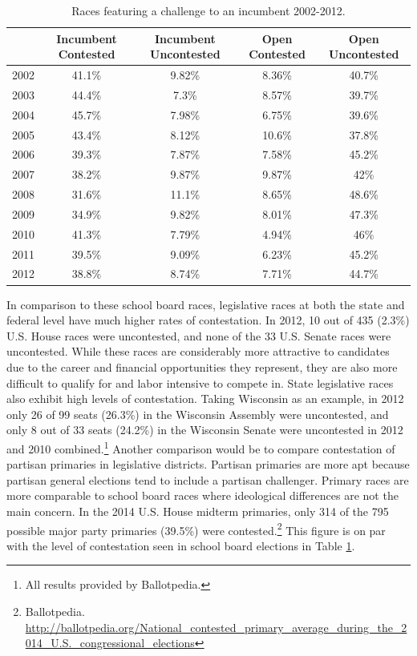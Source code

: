 \begin{table}[ht]
\centering
{\small
\begin{tabular}{lcccc}
  \hline
 & Incumbent Contested & Incumbent Uncontested & Open Contested & Open Uncontested \\ 
  \hline
2002 & 41.1\% & 9.82\% & 8.36\% & 40.7\% \\ 
  2003 & 44.4\% & 7.3\% & 8.57\% & 39.7\% \\ 
  2004 & 45.7\% & 7.98\% & 6.75\% & 39.6\% \\ 
  2005 & 43.4\% & 8.12\% & 10.6\% & 37.8\% \\ 
  2006 & 39.3\% & 7.87\% & 7.58\% & 45.2\% \\ 
  2007 & 38.2\% & 9.87\% & 9.87\% & 42\% \\ 
  2008 & 31.6\% & 11.1\% & 8.65\% & 48.6\% \\ 
  2009 & 34.9\% & 9.82\% & 8.01\% & 47.3\% \\ 
  2010 & 41.3\% & 7.79\% & 4.94\% & 46\% \\ 
  2011 & 39.5\% & 9.09\% & 6.23\% & 45.2\% \\ 
  2012 & 38.8\% & 8.74\% & 7.71\% & 44.7\% \\ 
   \hline
\end{tabular}
}
\caption{Races featuring a challenge to an incumbent 2002-2012.} 
\label{tab:incumbentContest}
\end{table}



In comparison to these school board races, legislative races at both the state and federal 
level have much higher rates of contestation. In 2012, 10 out of 435 (2.3\%) U.S. House 
races were uncontested, and none of the 33 U.S. Senate races were uncontested. 
While these races are considerably more attractive to candidates due to the career and financial 
opportunities they represent, they are also more difficult to qualify for and 
labor intensive to compete in. State legislative races also exhibit high levels 
of contestation. Taking Wisconsin as an example, in 2012 only 26 of 99 seats 
(26.3\%) in the 
Wisconsin Assembly were uncontested, and only 8 out of 33 seats (24.2\%) in the Wisconsin 
Senate were uncontested in 2012 and 2010 combined.\footnote{All results provided 
by Ballotpedia.} Another comparison would be to compare contestation of partisan 
primaries in legislative districts. Partisan primaries are more apt because partisan 
general elections tend to include a partisan challenger. Primary races are more 
comparable to school board races where ideological differences are not the main 
concern. In the 2014 
U.S. House midterm primaries, only 314 of the 795 possible major party primaries (39.5\%)
were contested.\footnote{Ballotpedia. \url{http://ballotpedia.org/National_contested\_primary\_average\_during\_the\_2014\_U.S.\_congressional_elections}} This figure is on par with the level of 
contestation seen in school board elections in Table \ref{tab:incumbentContest}. 

